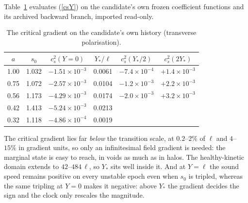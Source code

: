 \documentclass[11pt,letterpaper]{article}
\begin{document}
Table~\ref{tab} evaluates (\ref{csY}) on the candidate's own frozen coefficient functions and its archived backward branch, imported read-only.
\begin{table}[h]\centering\caption{The critical gradient on the candidate's own history (transverse polarisation).}\label{tab}
\begin{tabular}{cccccc}\toprule
$a$ & $s_0$ & $c_s^2(Y=0)$ & $Y_*/\ell$ & $c_s^2(Y_*/2)$ & $c_s^2(2Y_*)$\\\midrule
1.00 & 1.032 & $-1.51\times10^{-3}$ & 0.0061 & $-7.4\times10^{-4}$ & $+1.4\times10^{-3}$\\
0.75 & 1.072 & $-2.57\times10^{-3}$ & 0.0104 & $-1.2\times10^{-3}$ & $+2.2\times10^{-3}$\\
0.56 & 1.173 & $-4.29\times10^{-3}$ & 0.0174 & $-2.0\times10^{-3}$ & $+3.2\times10^{-3}$\\
0.42 & 1.413 & $-5.24\times10^{-3}$ & 0.0213 & &\\
0.32 & 1.118 & $-4.86\times10^{-4}$ & 0.0019 & &\\\bottomrule
\end{tabular}\end{table}
The critical gradient lies far \emph{below} the transition scale, at $0.2$--$2\%$ of $\ell$ and $4$--$15\%$ in gradient units, so only an infinitesimal field gradient is needed: the marginal state is easy to reach, in voids as much as in halos. The healthy-kinetic domain extends to $42$--$484\,\ell$, so $Y_*$ sits well inside it. And at $Y=\ell$ the sound speed remains positive on every unstable epoch even when $s_0$ is tripled, whereas the same tripling at $Y=0$ makes it negative: above $Y_*$ the gradient decides the sign and the clock only rescales the magnitude.
\end{document}
